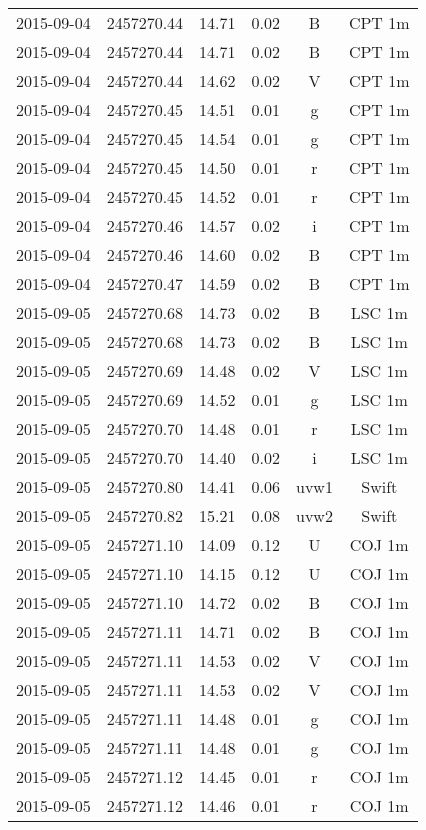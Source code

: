 \begin{table}
\begin{tabular}{cccccc}
2015-09-04 & 2457270.44 & 14.71 & 0.02 & B & CPT 1m \\
2015-09-04 & 2457270.44 & 14.71 & 0.02 & B & CPT 1m \\
2015-09-04 & 2457270.44 & 14.62 & 0.02 & V & CPT 1m \\
2015-09-04 & 2457270.45 & 14.51 & 0.01 & g & CPT 1m \\
2015-09-04 & 2457270.45 & 14.54 & 0.01 & g & CPT 1m \\
2015-09-04 & 2457270.45 & 14.50 & 0.01 & r & CPT 1m \\
2015-09-04 & 2457270.45 & 14.52 & 0.01 & r & CPT 1m \\
2015-09-04 & 2457270.46 & 14.57 & 0.02 & i & CPT 1m \\
2015-09-04 & 2457270.46 & 14.60 & 0.02 & B & CPT 1m \\
2015-09-04 & 2457270.47 & 14.59 & 0.02 & B & CPT 1m \\
2015-09-05 & 2457270.68 & 14.73 & 0.02 & B & LSC 1m \\
2015-09-05 & 2457270.68 & 14.73 & 0.02 & B & LSC 1m \\
2015-09-05 & 2457270.69 & 14.48 & 0.02 & V & LSC 1m \\
2015-09-05 & 2457270.69 & 14.52 & 0.01 & g & LSC 1m \\
2015-09-05 & 2457270.70 & 14.48 & 0.01 & r & LSC 1m \\
2015-09-05 & 2457270.70 & 14.40 & 0.02 & i & LSC 1m \\
2015-09-05 & 2457270.80 & 14.41 & 0.06 & uvw1 & Swift \\
2015-09-05 & 2457270.82 & 15.21 & 0.08 & uvw2 & Swift \\
2015-09-05 & 2457271.10 & 14.09 & 0.12 & U & COJ 1m \\
2015-09-05 & 2457271.10 & 14.15 & 0.12 & U & COJ 1m \\
2015-09-05 & 2457271.10 & 14.72 & 0.02 & B & COJ 1m \\
2015-09-05 & 2457271.11 & 14.71 & 0.02 & B & COJ 1m \\
2015-09-05 & 2457271.11 & 14.53 & 0.02 & V & COJ 1m \\
2015-09-05 & 2457271.11 & 14.53 & 0.02 & V & COJ 1m \\
2015-09-05 & 2457271.11 & 14.48 & 0.01 & g & COJ 1m \\
2015-09-05 & 2457271.11 & 14.48 & 0.01 & g & COJ 1m \\
2015-09-05 & 2457271.12 & 14.45 & 0.01 & r & COJ 1m \\
2015-09-05 & 2457271.12 & 14.46 & 0.01 & r & COJ 1m \\

\end{tabular}
\end{table}
